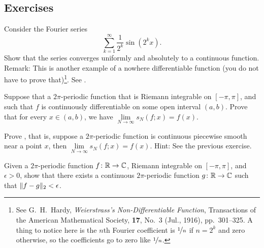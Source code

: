 \subsection{Exercises}

\begin{exercise} \label{exercise:fsweierser}
Consider the Fourier series
\begin{equation*}
\sum_{k=1}^\infty \frac{1}{2^k} \sin(2^k x) .
\end{equation*}
Show that the series converges uniformly and absolutely to a continuous
function.  Remark: This is another example of a nowhere differentiable
function (you do not have to prove that)\footnote{%
See
G.\ H.\ Hardy, \emph{Weierstrass's Non-Differentiable Function},
Transactions of the American Mathematical Society,
\textbf{17}, No.\ 3 (Jul., 1916), pp.\ 301--325.
A thing to notice here is the $n$th Fourier coefficient is $\nicefrac{1}{n}$
if $n=2^k$ and zero otherwise, so the coefficients go to zero like
$\nicefrac{1}{n}$.}.
See .
\begin{myfigureht}
\caption{Plot of 
$\sum_{n=1}^\infty \frac{1}{2^n} \sin(2^n x)$.\label{fig:fourierserweier}}
\end{myfigureht}
\end{exercise}

\begin{exercise}
Suppose that a $2\pi$-periodic function that is Riemann integrable
on $[-\pi,\pi]$, and such that $f$ is continuously differentiable
on some open interval $(a,b)$.  Prove that
for every $x \in (a,b)$, we have $\lim\limits_{N\to\infty} s_N(f;x) = f(x)$.
\end{exercise}

\begin{exercise}
Prove , that is,
suppose a $2\pi$-periodic function is continuous piecewise
smooth near a point $x$, then $\lim\limits_{N\to\infty} s_N(f;x) = f(x)$.  Hint: See the previous
exercise.
\end{exercise}

\begin{exercise} \label{exercise:contL2close}
Given a $2\pi$-periodic function $f \colon {\mathbb{R}} \to {\mathbb{C}}$, Riemann integrable on
$[-\pi,\pi]$,
and $\epsilon > 0$,
show that there exists a continuous $2\pi$-periodic function $g \colon {\mathbb{R}}
\to {\mathbb{C}}$ such that $\lVert {f-g} \rVert_2 < \epsilon$.
\end{exercise}

